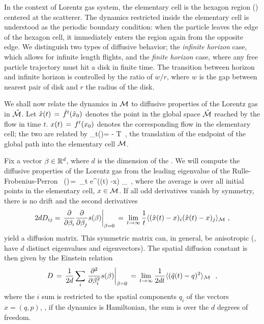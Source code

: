 \documentclass[aps,pre,showpacs,preprint,groupedaddress,floatfix]{revtex4-1}
\begin{document}
In the context of Lorentz gas system, the elementary cell is the
hexagon region () centered at the
scatterer. The dynamics restricted inside the elementary cell is
understood as the periodic boundary condition: when the particle
leaves the edge of the hexagon cell, it immediately enters the region
again from the opposite edge. We distinguish two types of diffusive
behavior; the {\em infinite horizon} case, which allows for infinite
length flights, and the {\em finite horizon} case, where any free
particle trajectory must hit a disk in finite time. The transition
between horizon and infinite horizon is controlled by the ratio of
$w/r$, where $w$ is the gap between nearest pair of disk and $r$ the
radius of the disk.

We shall now relate the dynamics in ${\cal M}$ to diffusive properties of
the Lorentz gas in $\hat {{\cal M}}$. Let $\hat x(t)\,=\,{\hat{f}^{t}(\hat x_0)}$ denotes the
point in the global space $\hat {{\cal M}}$ reached by the flow in time
$t$. $x(t)\,=\,{f^{t}({x_0})}$ denotes the corresponding flow in the
elementary cell; the two are related by
 \beq \hn_t(\xInit)=
 -  \in T \,, 
the translation of the endpoint of the global path into the elementary
cell $\pS$.

Fix a vector $\beta \in \reals^d$, where $d$ is the dimension of the
{\statesp}. We will compute the diffusive properties of the Lorentz
gas from the leading eigenvalue of the Rulle-Frobenius-Perron \evOper\
\beq \eigenvL(\beta)\,=\, \lim_{t \rightarrow \infty}  \log
\langle e^{\beta \cdot (\hx(t) -x) } \rangle_\pS ~, \quad
{}
where the average is over all initial points in the elementary cell,
$x \in \pS$. If all odd derivatives vanish by symmetry, there is no drift and the second derivatives
\[
2d D_{ij} = \left . {\frac{\partial}{\partial \beta_i}}
  {\frac{\partial} {\partial \beta_j}} \eigenvL(\beta)\right
|_{\beta=0} \,=\,\lim_{t\rightarrow \infty} {\frac{1}{t}} \langle
{(\hx(t) -x)_i (\hx(t) -x)_j } \rangle_\pS ~,
\]
yield a diffusion matrix.  This symmetric matrix can, in general, be
anisotropic (\ie, have $d$ distinct eigenvalues and
eigen\-vectors). The spatial diffusion constant is then given by the
Einstein relation
\[
D\,=\,{1\over 2 d} \sum_i \left .{{\partial}^2 \over {\partial
      \beta^2_i}} s(\beta)\right |_{\beta=0} \,=\,
\lim_{t\rightarrow \infty} {1\over{2d t}} \langle {(\hat{q}(t) -q)^2 }
\rangle_{{\cal M}}~ ~,
\]
where the $i$ sum is restricted to the spatial components $q_i$ of the
{\statesp} vectors $x=(q,p)$, \ie, if the dynamics is Hamiltonian, the
sum is over the $d$ degrees of freedom.
\end{document}
